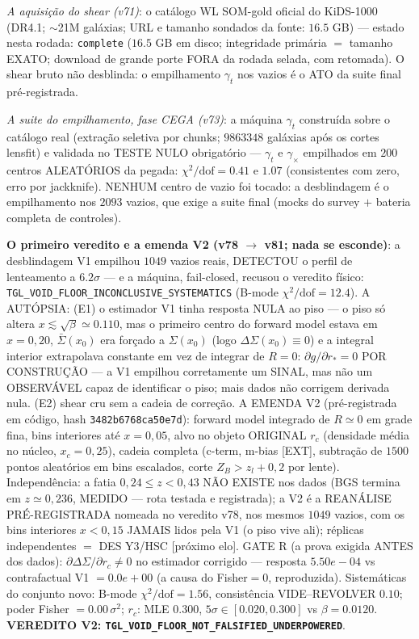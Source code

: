 \documentclass[11pt]{article}
\theoremstyle{definition}\newtheorem{deriv}{Derivação}
\begin{document}
\emph{A aquisição do shear (v71)}: o catálogo WL SOM-gold oficial do KiDS-1000 (DR4.1; $\sim$21M galáxias; URL e tamanho sondados da fonte: $16.5$ GB) --- estado nesta rodada: \texttt{complete} ($16.5$ GB em disco; integridade primária $=$ tamanho EXATO; download de grande porte FORA da rodada selada, com retomada). O shear bruto não desblinda: o empilhamento $\gamma_t$ nos vazios é o ATO da suite final pré-registrada.

\emph{A suite do empilhamento, fase CEGA (v73)}: a máquina $\gamma_t$ construída sobre o catálogo real (extração seletiva por chunks; $9863348$ galáxias após os cortes lensfit) e validada no TESTE NULO obrigatório --- $\gamma_t$ e $\gamma_\times$ empilhados em $200$ centros ALEATÓRIOS da pegada: $\chi^2/\mathrm{dof}=0.41$ e $1.07$ (consistentes com zero, erro por jackknife). NENHUM centro de vazio foi tocado: a desblindagem é o empilhamento nos $2093$ vazios, que exige a suite final (mocks do survey $+$ bateria completa de controles).

\textbf{O primeiro veredito e a emenda V2 (v78 $\to$ v81; nada se esconde)}: a desblindagem V1 empilhou $1049$ vazios reais, DETECTOU o perfil de lenteamento a $6.2\sigma$ --- e a máquina, fail-closed, recusou o veredito físico: \texttt{TGL\_VOID\_FLOOR\_INCONCLUSIVE\_SYSTEMATICS} (B-mode $\chi^2/\mathrm{dof}=12.4$). A AUTÓPSIA: (E1) o estimador V1 tinha resposta NULA ao piso --- o piso só altera $x\lesssim\sqrt{\beta}\simeq0.110$, mas o primeiro centro do forward model estava em $x=0{,}20$, $\bar\Sigma(x_0)$ era forçado a $\Sigma(x_0)$ (logo $\Delta\Sigma(x_0)\equiv0$) e a integral interior extrapolava constante em vez de integrar de $R=0$: $\partial g/\partial r_*=0$ POR CONSTRUÇÃO --- a V1 empilhou corretamente um SINAL, mas não um OBSERVÁVEL capaz de identificar o piso; mais dados não corrigem derivada nula. (E2) shear cru sem a cadeia de correção. A EMENDA V2 (pré-registrada em código, hash \texttt{3482b6768ca50e7d}): forward model integrado de $R\simeq0$ em grade fina, bins interiores até $x=0{,}05$, alvo no objeto ORIGINAL $r_c$ (densidade média no núcleo, $x_c=0{,}25$), cadeia completa (c-term, m-bias [EXT], subtração de $1500$ pontos aleatórios em bins escalados, corte $Z_B>z_l+0{,}2$ por lente). Independência: a fatia $0{,}24\le z<0{,}43$ NÃO EXISTE nos dados (BGS termina em $z\simeq0{,}236$, MEDIDO --- rota testada e registrada); a V2 é a REANÁLISE PRÉ-REGISTRADA nomeada no veredito v78, nos mesmos $1049$ vazios, com os bins interiores $x<0{,}15$ JAMAIS lidos pela V1 (o piso vive ali); réplicas independentes $=$ DES Y3/HSC [próximo elo]. GATE R (a prova exigida ANTES dos dados): $\partial\Delta\Sigma/\partial r_c\neq0$ no estimador corrigido --- resposta $5.50e-04$ vs contrafactual V1 $= 0.0e+00$ (a causa do Fisher$=0$, reproduzida). Sistemáticas do conjunto novo: B-mode $\chi^2/\mathrm{dof}=1.56$, consistência VIDE--REVOLVER $0.10$; poder Fisher $=0.00\,\sigma^2$; $r_c$: MLE $0.300$, $5\sigma\in[0.020,0.300]$ vs $\beta=0.0120$. \textbf{VEREDITO V2: \texttt{TGL\_VOID\_FLOOR\_NOT\_FALSIFIED\_UNDERPOWERED}}.
\end{document}
